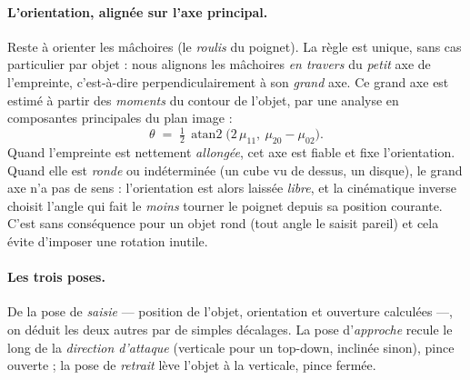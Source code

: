 
\paragraph{L'orientation, alignée sur l'axe principal.} Reste à orienter les mâchoires (le \emph{roulis} du poignet). La règle est unique, sans cas particulier par objet : nous alignons les mâchoires \emph{en travers} du \emph{petit} axe de l'empreinte, c'est-à-dire perpendiculairement à son \emph{grand} axe. Ce grand axe est estimé à partir des \emph{moments} du contour de l'objet, par une analyse en composantes principales du plan image :
\[
  \theta \;=\; \tfrac{1}{2}\,\operatorname{atan2}\!\big(2\,\mu_{11},\ \mu_{20} - \mu_{02}\big) .
\]
Quand l'empreinte est nettement \emph{allongée}, cet axe est fiable et fixe l'orientation. Quand elle est \emph{ronde} ou indéterminée (un cube vu de dessus, un disque), le grand axe n'a pas de sens : l'orientation est alors laissée \emph{libre}, et la cinématique inverse choisit l'angle qui fait le \emph{moins} tourner le poignet depuis sa position courante. C'est sans conséquence pour un objet rond (tout angle le saisit pareil) et cela évite d'imposer une rotation inutile.

\paragraph{Les trois poses.} De la pose de \emph{saisie} --- position de l'objet, orientation et ouverture calculées ---, on déduit les deux autres par de simples décalages. La pose d'\emph{approche} recule le long de la \emph{direction d'attaque} (verticale pour un top-down, inclinée sinon), pince ouverte ; la pose de \emph{retrait} lève l'objet à la verticale, pince fermée.


